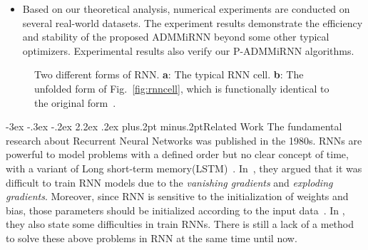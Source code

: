 \documentclass[twoside]{article}
\makeatletter
\def\section{\@startsection{section}{1}{\z@}%
 {-3ex \@plus -.3ex \@minus -.2ex}%
 {2.2ex \@plus.2ex}%
{\normalfont\normalsize\protect\baselineskip=14.5pt plus.2pt minus.2pt\bfseries}}
\makeatother
\begin{document}
\begin{multicols}{2}
\begin{itemize}
\item Based on our theoretical analysis, numerical experiments are conducted on several real-world datasets. The experiment results demonstrate the efficiency and stability of the proposed ADMMiRNN beyond some other typical optimizers. Experimental results also verify our P-ADMMiRNN algorithms. 
\end{itemize}

\begin{figure}[htbp]
\centering
{}
\quad
\quad \quad \quad \quad
{}
\caption{Two different forms of RNN. \textbf{a}: The typical RNN cell. \textbf{b}: The unfolded form of Fig.~\ref{fig:rnncell}, which is functionally identical to the original form~\cite{goodfellow2016deep}.}
\end{figure}

\section{Related Work}\label{sec:related_work}
The fundamental research about Recurrent Neural Networks was published in the 1980s.
RNNs are powerful to model problems with a defined order but no clear concept of time, with a variant of Long short-term memory(LSTM)~\cite{hochreiter1997long}. 
In~\cite{bengio1994learning}, they argued that it was difficult to train RNN models due to the \textit{vanishing gradients} and \textit{exploding gradients}.
Moreover, since RNN is sensitive to the initialization of weights and bias, those parameters should be initialized according to the input data~\cite{sutskever2013importance}. In \cite{pascanu2013difficulty}, they also state some difficulties in train RNNs. There is still a lack of a method to solve these above problems in RNN at the same time until now.


\end{multicols}
\end{document}
